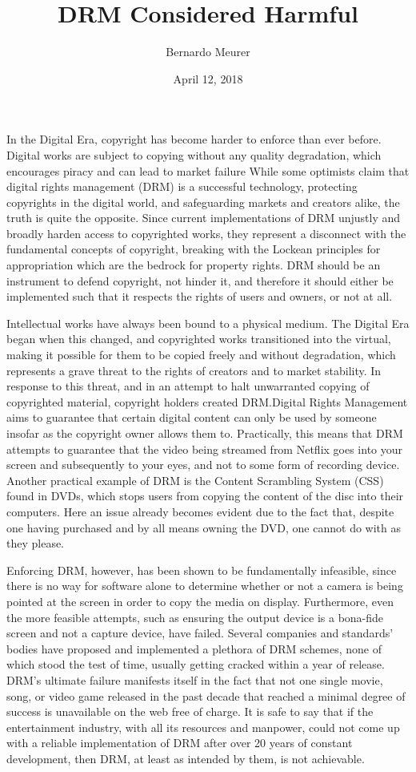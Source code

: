 \documentclass[12pt,letterpaper]{article}
\title{DRM Considered Harmful}
\author{Bernardo Meurer}
\date{April 12, 2018}
\begin{document}
\maketitle
\newpage
\doublespacing%
In the Digital Era, copyright has become harder to enforce than ever before. Digital works are subject to copying without any quality degradation, which encourages piracy and can lead to market failure\autocite[\ppno~118]{favale-2014} While some optimists\autocite[\ppno~236]{goldstein-1996} claim that digital rights management (DRM) is a successful technology, protecting copyrights in the digital world, and safeguarding markets and creators alike, the truth is quite the opposite. Since current implementations of DRM unjustly and broadly harden access to copyrighted works, they represent a disconnect with the fundamental concepts of copyright, breaking with the Lockean principles for appropriation which are the bedrock for property rights. DRM should be an instrument to defend copyright, not hinder it, and therefore it should either be implemented such that it respects the rights of users and owners, or not at all.

Intellectual works have always been bound to a physical medium. The Digital Era began when this changed, and copyrighted works transitioned into the virtual, making it possible for them to be copied freely and without degradation, which represents a grave threat to the rights of creators and to market stability\autocite[\ppno~117]{favale-2014}. In response to this threat, and in an attempt to halt unwarranted copying of copyrighted material, copyright holders created DRM.\@ Digital Rights Management aims to guarantee that certain digital content can only be used by someone insofar as the copyright owner allows them to. Practically, this means that DRM attempts to guarantee that the video being streamed from Netflix goes into your screen and subsequently to your eyes, and not to some form of recording device. Another practical example of DRM is the Content Scrambling System (CSS) found in DVDs, which stops users from copying the content of the disc into their computers. Here an issue already becomes evident due to the fact that, despite one having purchased and by all means owning the DVD, one cannot do with as they please.

Enforcing DRM, however, has been shown to be fundamentally infeasible, since there is no way for software alone to determine whether or not a camera is being pointed at the screen in order to copy the media on display. Furthermore, even the more feasible attempts, such as ensuring the output device is a bona-fide screen and not a capture device, have failed. Several companies and standards' bodies have proposed and implemented a plethora of DRM schemes, none of which stood the test of time, usually getting cracked within a year of release. DRM's ultimate failure manifests itself in the fact that not one single movie, song, or video game released in the past decade that reached a minimal degree of success is unavailable on the web free of charge. It is safe to say that if the entertainment industry, with all its resources and manpower, could not come up with a reliable implementation of DRM after over 20 years of constant development, then DRM, at least as intended by them, is not achievable.
\end{document}
